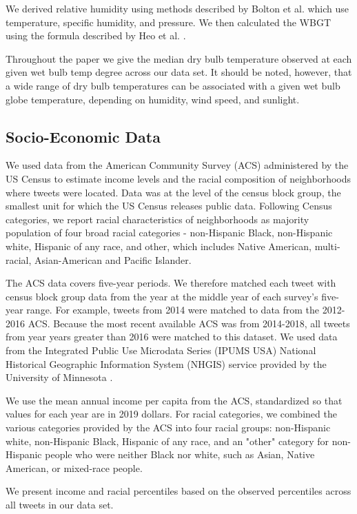 \documentclass[fleqn,10pt]{wlscirep}
\begin{document}
We derived relative humidity using methods described by Bolton et al. \cite{bolton_computation_1980} which use temperature, specific humidity, and pressure. We then calculated the WBGT using the formula described by Heo et al. \cite{heo2019comparison}.

Throughout the paper we give the median dry bulb temperature observed at each given wet bulb temp degree across our data set. It should be noted, however, that a wide range of dry bulb temperatures can be associated with a given wet bulb globe temperature, depending on humidity, wind speed, and sunlight.

\subsection*{Socio-Economic Data}
We used data from the American Community Survey (ACS) administered by the US Census to estimate income levels and the racial composition of neighborhoods where tweets were located. Data was at the level of the census block group, the smallest unit for which the US Census releases public data. Following Census categories, we report racial characteristics of neighborhoods as majority population of four broad racial categories - non-Hispanic Black, non-Hispanic white, Hispanic of any race, and other, which includes Native American, multi-racial, Asian-American and Pacific Islander. 

The ACS data covers five-year periods. We therefore matched each tweet with census block group data from the year at the middle year of each survey's five-year range. For example, tweets from 2014 were matched to data from the 2012-2016 ACS. Because the most recent available ACS was from 2014-2018, all tweets from year years greater than 2016 were matched to this dataset. We used data from the Integrated Public Use Microdata Series (IPUMS USA) National Historical Geographic Information System (NHGIS) service provided by the University of Minnesota \cite{ruggles2018ipums}.

We use the mean annual income per capita from the ACS, standardized so that values for each year are in 2019 dollars. For racial categories, we combined the various categories provided by the ACS into four racial groups: non-Hispanic white, non-Hispanic Black, Hispanic of any race, and an "other" category for non-Hispanic people who were neither Black nor white, such as Asian, Native American, or mixed-race people.

We present income and racial percentiles based on the observed percentiles across all tweets in our data set.
 
\end{document}
